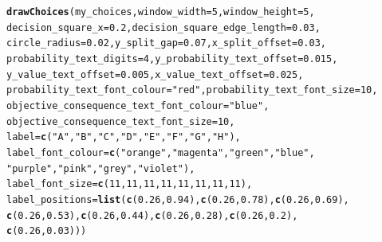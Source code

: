 \documentclass{article}\usepackage[]{graphicx}\usepackage[]{color}
\makeatletter
\newcommand{\hlnum}[1]{\textcolor[rgb]{0.686,0.059,0.569}{#1}}%
\newcommand{\hlstr}[1]{\textcolor[rgb]{0.192,0.494,0.8}{#1}}%
\newcommand{\hlstd}[1]{\textcolor[rgb]{0.345,0.345,0.345}{#1}}%
\newcommand{\hlkwc}[1]{\textcolor[rgb]{0.333,0.667,0.333}{#1}}%
\newcommand{\hlkwd}[1]{\textcolor[rgb]{0.737,0.353,0.396}{\textbf{#1}}}%
\newenvironment{kframe}{%
 \def\at@end@of@kframe{}%
 \ifinner\ifhmode%
  \def\at@end@of@kframe{\end{minipage}}%
  \begin{minipage}{\columnwidth}%
 \fi\fi%
 \def\FrameCommand##1{\hskip\@totalleftmargin \hskip-\fboxsep
 \colorbox{shadecolor}{##1}\hskip-\fboxsep
     \hskip-\linewidth \hskip-\@totalleftmargin \hskip\columnwidth}%
 \MakeFramed {\advance\hsize-\width
   \@totalleftmargin\z@ \linewidth\hsize
   \@setminipage}}%
 {\par\unskip\endMakeFramed%
 \at@end@of@kframe}
\newenvironment{knitrout}{}{} %
\makeatother
\begin{document}
\begin{knitrout}
\begin{kframe}
\begin{verbatim}
\end{verbatim}
\begin{alltt}
\hlkwd{drawChoices}\hlstd{(my_choices,} \hlkwc{window_width}\hlstd{=}\hlnum{5}\hlstd{,} \hlkwc{window_height}\hlstd{=}\hlnum{5}\hlstd{,}
        \hlkwc{decision_square_x}\hlstd{=}\hlnum{0.2}\hlstd{,} \hlkwc{decision_square_edge_length}\hlstd{=}\hlnum{0.03}\hlstd{,}
        \hlkwc{circle_radius}\hlstd{=}\hlnum{0.02}\hlstd{,} \hlkwc{y_split_gap}\hlstd{=}\hlnum{0.07}\hlstd{,} \hlkwc{x_split_offset}\hlstd{=}\hlnum{0.03}\hlstd{,}
        \hlkwc{probability_text_digits}\hlstd{=}\hlnum{4}\hlstd{,} \hlkwc{y_probability_text_offset}\hlstd{=}\hlnum{0.015}\hlstd{,}
        \hlkwc{y_value_text_offset}\hlstd{=}\hlnum{0.005}\hlstd{,} \hlkwc{x_value_text_offset}\hlstd{=}\hlnum{0.025}\hlstd{,}
        \hlkwc{probability_text_font_colour}\hlstd{=}\hlstr{"red"}\hlstd{,} \hlkwc{probability_text_font_size}\hlstd{=}\hlnum{10}\hlstd{,}
        \hlkwc{objective_consequence_text_font_colour}\hlstd{=}\hlstr{"blue"}\hlstd{,}
        \hlkwc{objective_consequence_text_font_size}\hlstd{=}\hlnum{10}\hlstd{,}
        \hlkwc{label}\hlstd{=}\hlkwd{c}\hlstd{(}\hlstr{"A"}\hlstd{,}\hlstr{"B"}\hlstd{,}\hlstr{"C"}\hlstd{,}\hlstr{"D"}\hlstd{,}\hlstr{"E"}\hlstd{,}\hlstr{"F"}\hlstd{,}\hlstr{"G"}\hlstd{,}\hlstr{"H"}\hlstd{),}
        \hlkwc{label_font_colour}\hlstd{=}\hlkwd{c}\hlstd{(}\hlstr{"orange"}\hlstd{,}\hlstr{"magenta"}\hlstd{,}\hlstr{"green"}\hlstd{,}\hlstr{"blue"}\hlstd{,}
                \hlstr{"purple"}\hlstd{,}\hlstr{"pink"}\hlstd{,}\hlstr{"grey"}\hlstd{,}\hlstr{"violet"}\hlstd{),}
        \hlkwc{label_font_size}\hlstd{=}\hlkwd{c}\hlstd{(}\hlnum{11}\hlstd{,}\hlnum{11}\hlstd{,}\hlnum{11}\hlstd{,}\hlnum{11}\hlstd{,}\hlnum{11}\hlstd{,}\hlnum{11}\hlstd{,}\hlnum{11}\hlstd{,}\hlnum{11}\hlstd{),}
        \hlkwc{label_positions}\hlstd{=}\hlkwd{list}\hlstd{(}\hlkwd{c}\hlstd{(}\hlnum{0.26}\hlstd{,}\hlnum{0.94}\hlstd{),}\hlkwd{c}\hlstd{(}\hlnum{0.26}\hlstd{,}\hlnum{0.78}\hlstd{),}\hlkwd{c}\hlstd{(}\hlnum{0.26}\hlstd{,}\hlnum{0.69}\hlstd{),}
                \hlkwd{c}\hlstd{(}\hlnum{0.26}\hlstd{,}\hlnum{0.53}\hlstd{),}\hlkwd{c}\hlstd{(}\hlnum{0.26}\hlstd{,}\hlnum{0.44}\hlstd{),}\hlkwd{c}\hlstd{(}\hlnum{0.26}\hlstd{,}\hlnum{0.28}\hlstd{),}\hlkwd{c}\hlstd{(}\hlnum{0.26}\hlstd{,}\hlnum{0.2}\hlstd{),}
                \hlkwd{c}\hlstd{(}\hlnum{0.26}\hlstd{,}\hlnum{0.03}\hlstd{)))}
\end{alltt}
\end{kframe}


\end{knitrout}
\end{document}
